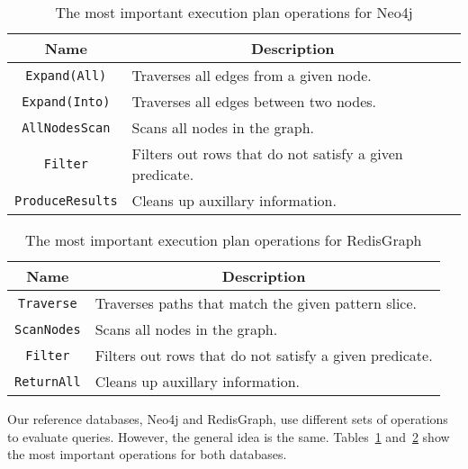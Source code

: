 \documentclass[14pt]{constructor-thesis}
\theoremstyle{definition}
\begin{document}
\begin{table}[t]
  \centering
  
  \begin{center}
    \begin{tabular}{ |c|l|  }
      \hline
      Name & \multicolumn{1}{c|}{Description} \\
      \hline
      \texttt{Expand(All)} & Traverses all edges from a given node. \\
      \texttt{Expand(Into)} & Traverses all edges between two nodes. \\
      \texttt{AllNodesScan} & Scans all nodes in the graph. \\
      \texttt{Filter} & Filters out rows that do not satisfy a given predicate. \\
      \texttt{ProduceResults} & Cleans up auxillary information. \\
      \hline
    \end{tabular}
  \end{center}
  \caption{The most important execution plan operations for Neo4j}
  \label{tab:execution-plan-operations-summary-Neo4j}
\end{table}
\begin{table}[t]
  \begin{center}
    \begin{tabular}{ |c|l|  }
      \hline
      Name & \multicolumn{1}{c|}{Description} \\
      \hline
      \texttt{Traverse} & Traverses paths that match the given pattern slice. \\
      \texttt{ScanNodes} & Scans all nodes in the graph. \\
      \texttt{Filter} & Filters out rows that do not satisfy a given predicate. \\
      \texttt{ReturnAll} & Cleans up auxillary information. \\
      \hline
    \end{tabular}
  \end{center}
  \caption{The most important execution plan operations for RedisGraph}
  \label{tab:execution-plan-operations-summary-RedisGraph}
\end{table}

Our reference databases, Neo4j and RedisGraph, use different sets of operations to evaluate queries. However, the general idea is the same. Tables~\ref{tab:execution-plan-operations-summary-Neo4j} and~\ref{tab:execution-plan-operations-summary-RedisGraph} show the most important operations for both databases.
\end{document}
